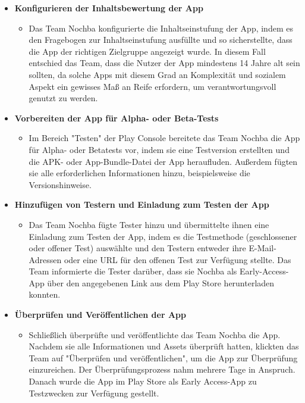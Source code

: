 \begin{itemize}
\begin{itemize}
          \end{itemize}
    \item \textbf{Konfigurieren der Inhaltsbewertung der App}
          \begin{itemize}
              \item {Das Team Nochba konfigurierte die Inhaltseinstufung der App, indem es den Fragebogen zur Inhaltseinstufung ausfüllte und so sicherstellte, dass die App der richtigen Zielgruppe angezeigt wurde. In diesem Fall entschied das Team, dass die Nutzer der App mindestens 14 Jahre alt sein sollten, da solche Apps mit diesem Grad an Komplexität und sozialem Aspekt ein gewisses Maß an Reife erfordern, um verantwortungsvoll genutzt zu werden.}
          \end{itemize}
    \item \textbf{Vorbereiten der App für Alpha- oder Beta-Tests}
          \begin{itemize}
              \item {Im Bereich "Testen" der Play Console bereitete das Team Nochba die App für Alpha- oder Betatests vor, indem sie eine Testversion erstellten und die APK- oder App-Bundle-Datei der App heraufluden. Außerdem fügten sie alle erforderlichen Informationen hinzu, beispielsweise die Versionshinweise.}
          \end{itemize}
    \item \textbf{Hinzufügen von Testern und Einladung zum Testen der App}
          \begin{itemize}
              \item {Das Team Nochba fügte Tester hinzu und übermittelte ihnen eine Einladung zum Testen der App, indem es die Testmethode (geschlossener oder offener Test) auswählte und den Testern entweder ihre E-Mail-Adressen oder eine URL für den offenen Test zur Verfügung stellte. Das Team informierte die Tester darüber, dass sie Nochba als Early-Access-App über den angegebenen Link aus dem Play Store herunterladen konnten.}
          \end{itemize}
    \item \textbf{Überprüfen und Veröffentlichen der App}
          \begin{itemize}
              \item {Schließlich überprüfte und veröffentlichte das Team Nochba die App. Nachdem sie alle Informationen und Assets überprüft hatten, klickten das Team auf "Überprüfen und veröffentlichen", um die App zur Überprüfung einzureichen. Der Überprüfungsprozess nahm mehrere Tage in Anspruch. Danach wurde die App im Play Store als Early Access-App zu Testzwecken zur Verfügung gestellt.}
          \end{itemize}
\end{itemize}

